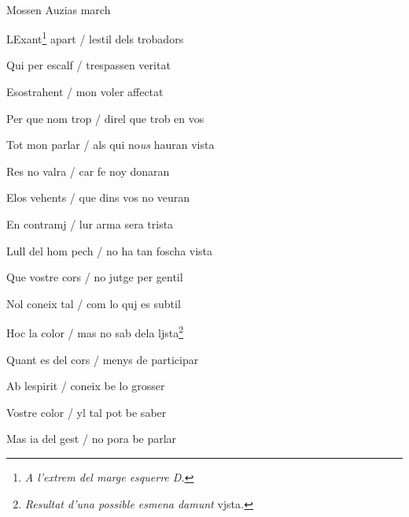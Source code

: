 \documentclass[12pt]{article}
\renewcommand{\espaiAbansEtiquetaPoema}{\vspace{0ex}}
\begin{document}
\begin{estrofa}

\espaiAbansEtiquetaPoema

\\

\begin{rubrica}

Mossen Auzias march

\end{rubrica}

\end{estrofa}


\begin{estrofa}

 LExant\footnote{\textit{A l'extrem del marge esquerre D.}} apart / lestil dels
trobadors

 Qui per escalf / trespassen veritat

 Esostrahent / mon voler affectat

 Per que nom trop / direl que trob en vos

 Tot mon parlar / als qui no\textit{us} hauran vista

 Res no valra / car fe noy donaran

 Elos vehents / que dins vos no veuran

 En contramj / lur arma sera trista

\end{estrofa}



\begin{estrofa}

 Lull del hom pech / no ha tan foscha vista

 Que vostre cors / no jutge per gentil

 Nol coneix tal / com lo quj es subtil

 Hoc la color / mas no sab dela ljsta\footnote{\textit{Resultat d'una possible
esmena damunt }vjsta\textit{.}}

 Quant es del cors / menys de participar

 Ab lespirit / coneix be lo grosser

 Vostre color / yl tal pot be saber

 Mas ia del gest / no pora be parlar

\end{estrofa}
\end{document}
